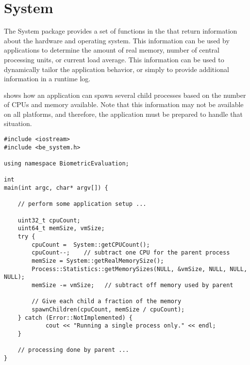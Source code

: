 %
%
\chapter{System}
\label{chp-system}
The System package provides a set of functions in the that
return information about the hardware and operating system. This information
can be used by applications to determine the amount of real memory, number of
central processing units, or current load average. This information can be
used to dynamically tailor the application behavior, or simply to provide
additional information in a runtime log.

 shows how an application can spawn several child
processes based on the number of CPUs and memory available. Note that this
information may not be available on all platforms, and therefore, the
application must be prepared to handle that situation.

\begin{lstlisting}[caption={Using the System CPU Count Information}, label=cpucountuse]
#include <iostream>
#include <be_system.h>

using namespace BiometricEvaluation;

int
main(int argc, char* argv[]) {

    // perform some application setup ...

    uint32_t cpuCount;
    uint64_t memSize, vmSize;
    try {
        cpuCount =  System::getCPUCount();
        cpuCount--;    // subtract one CPU for the parent process
        memSize = System::getRealMemorySize();
        Process::Statistics::getMemorySizes(NULL, &vmSize, NULL, NULL, NULL);
        memSize -= vmSize;   // subtract off memory used by parent

        // Give each child a fraction of the memory
        spawnChildren(cpuCount, memSize / cpuCount);
    } catch (Error::NotImplemented) {
            cout << "Running a single process only." << endl;
    }

    // processing done by parent ...
}

\end{lstlisting}
